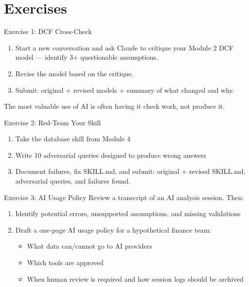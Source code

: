 \documentclass[aspectratio=169]{beamer}
\begin{document}
\section{Exercises}

\begin{frame}{Exercise 1: DCF Cross-Check}
\begin{enumerate}
  \item Start a new conversation and ask Claude to critique your Module 2 DCF model --- identify 3+ questionable assumptions.
  \item Revise the model based on the critique.
  \item Submit: original + revised models + summary of what changed and why.
\end{enumerate}
\vspace{0.3cm}
\alert{The most valuable use of AI is often having it check work, not produce it.}
\end{frame}

\begin{frame}{Exercise 2: Red-Team Your Skill}
\vfill
\begin{enumerate}
  \item Take the database skill from Module 4
  \item Write 10 adversarial queries designed to produce wrong answers
  \item Document failures, fix SKILL.md, and submit: original + revised SKILL.md, adversarial queries, and failures found.
\end{enumerate}
\end{frame}

\begin{frame}{Exercise 3: AI Usage Policy}
Review a transcript of an AI analysis session. Then:
\begin{enumerate}
  \item Identify potential errors, unsupported assumptions, and missing validations
  \item Draft a one-page AI usage policy for a hypothetical finance team:
  \begin{itemize}\small
    \item What data can/cannot go to AI providers
    \item Which tools are approved
    \item When human review is required and how session logs should be archived
  \end{itemize}
\end{enumerate}
\end{frame}
\end{document}
